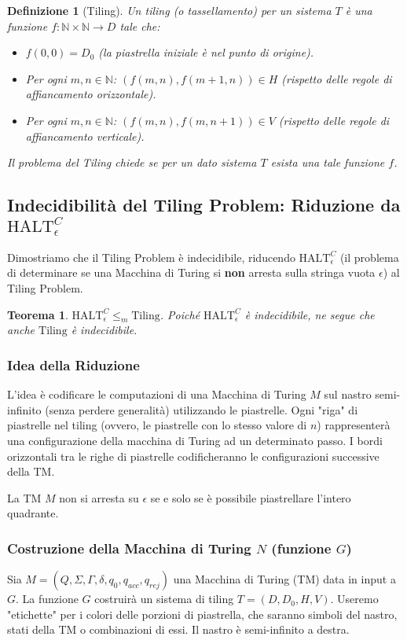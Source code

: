 \documentclass[a4paper]{article}
\newtheorem{theorem}{Teorema}
\newtheorem{definition}{Definizione}
\begin{document}
\begin{definition}[Tiling]
Un \emph{tiling} (o tassellamento) per un sistema $T$ è una funzione $f: \mathbb{N} \times \mathbb{N} \to D$ tale che:
\begin{itemize}
    \item $f(0,0) = D_0$ (la piastrella iniziale è nel punto di origine).
    \item Per ogni $m, n \in \mathbb{N}$: $(f(m,n), f(m+1,n)) \in H$ (rispetto delle regole di affiancamento orizzontale).
    \item Per ogni $m, n \in \mathbb{N}$: $(f(m,n), f(m,n+1)) \in V$ (rispetto delle regole di affiancamento verticale).
\end{itemize}
Il problema del Tiling chiede se per un dato sistema $T$ esista una tale funzione $f$.
\end{definition}

\subsection{Indecidibilit\`a del Tiling Problem: Riduzione da $\text{HALT}_\epsilon^C$}
Dimostriamo che il Tiling Problem è indecidibile, riducendo $\text{HALT}_\epsilon^C$ (il problema di determinare se una Macchina di Turing si \textbf{non} arresta sulla stringa vuota $\epsilon$) al Tiling Problem.

\begin{theorem}
$\text{HALT}_\epsilon^C \le_m \text{Tiling}$. Poiché $\text{HALT}_\epsilon^C$ è indecidibile, ne segue che anche $\text{Tiling}$ è indecidibile.
\end{theorem}

\subsubsection{Idea della Riduzione}
L'idea è codificare le computazioni di una Macchina di Turing $M$ sul nastro semi-infinito (senza perdere generalità) utilizzando le piastrelle. Ogni "riga" di piastrelle nel tiling (ovvero, le piastrelle con lo stesso valore di $n$) rappresenterà una configurazione della macchina di Turing ad un determinato passo. I bordi orizzontali tra le righe di piastrelle codificheranno le configurazioni successive della TM.

La TM $M$ non si arresta su $\epsilon$ se e solo se è possibile piastrellare l'intero quadrante.

\subsubsection{Costruzione della Macchina di Turing $N$ (funzione $G$)}
Sia $M = (Q, \Sigma, \Gamma, \delta, q_0, q_{acc}, q_{rej})$ una Macchina di Turing (TM) data in input a $G$. La funzione $G$ costruirà un sistema di tiling $T=(D, D_0, H, V)$.
Useremo "etichette" per i colori delle porzioni di piastrella, che saranno simboli del nastro, stati della TM o combinazioni di essi. Il nastro è semi-infinito a destra.
\end{document}
